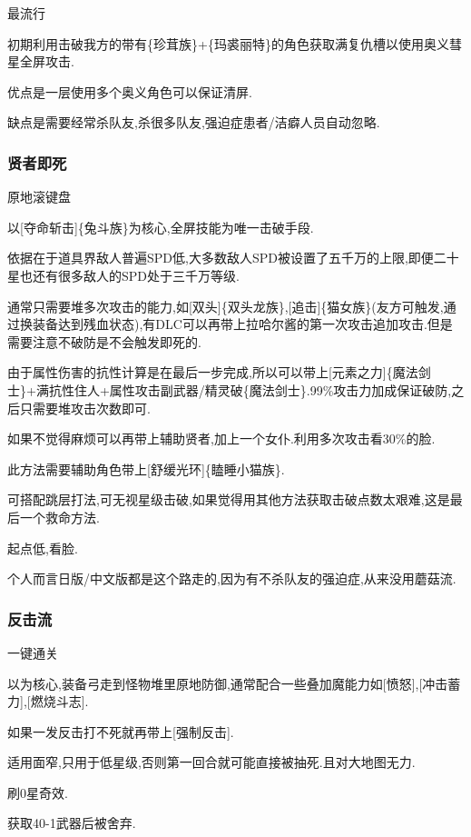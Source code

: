 		最流行

		初期利用击破我方的带有{\color{red}{自我牺牲}}\{珍茸族\}+{\color{red}{惊惧死灵}}\{玛裘丽特\}的角色获取满复仇槽以使用奥义彗星全屏攻击.

		优点是一层使用多个奥义角色可以保证清屏.
		
		缺点是需要经常杀队友,杀很多队友,强迫症患者/洁癖人员自动忽略.

		\subsubsection{贤者即死}

		原地滚键盘

		以[夺命斩击]\{兔斗族\}为核心,全屏技能为唯一击破手段.

		依据在于道具界敌人普遍SPD低,大多数敌人SPD被设置了五千万的上限,即便二十星也还有很多敌人的SPD处于三千万等级.

		通常只需要堆多次攻击的能力,如[双头]\{双头龙族\},[追击]\{猫女族\}(友方可触发,通过换装备达到残血状态),有DLC可以再带上拉哈尔酱的第一次攻击追加攻击.但是需要注意不破防是不会触发即死的.

		由于属性伤害的抗性计算是在最后一步完成,所以可以带上[元素之力]\{魔法剑士\}+满抗性住人+属性攻击副武器/精灵破\{魔法剑士\}.99\%攻击力加成保证破防,之后只需要堆攻击次数即可.

		如果不觉得麻烦可以再带上辅助贤者,加上一个女仆.利用多次攻击看30\%的脸.

		此方法需要辅助角色带上[舒缓光环]\{瞌睡小猫族\}.

		可搭配跳层打法,可无视星级击破,如果觉得用其他方法获取击破点数太艰难,这是最后一个救命方法.

		起点低,看脸.

		个人而言日版/中文版都是这个路走的,因为有不杀队友的强迫症,从来没用蘑菇流.


		\subsubsection{反击流}

		一键通关

		以{\color{red}{迎击架势}}为核心,装备弓走到怪物堆里原地防御,通常配合一些叠加魔能力如[愤怒],[冲击蓄力],[燃烧斗志].

		如果一发反击打不死就再带上[强制反击].

		适用面窄,只用于低星级,否则第一回合就可能直接被抽死.且对大地图无力.

		刷0星奇效.

		获取40-1武器后被舍弃.

